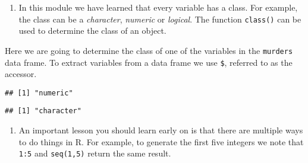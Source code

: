 \documentclass[
]{article}
\newenvironment{Shaded}{\begin{snugshade}}{\end{snugshade}}
\newcommand{\CommentTok}[1]{\textcolor[rgb]{0.56,0.35,0.01}{\textit{#1}}}
\newcommand{\KeywordTok}[1]{\textcolor[rgb]{0.13,0.29,0.53}{\textbf{#1}}}
\newcommand{\NormalTok}[1]{#1}
\newcommand{\OperatorTok}[1]{\textcolor[rgb]{0.81,0.36,0.00}{\textbf{#1}}}
\newcommand{\StringTok}[1]{\textcolor[rgb]{0.31,0.60,0.02}{#1}}
\providecommand{\tightlist}{%
  \setlength{\itemsep}{0pt}\setlength{\parskip}{0pt}}
\begin{document}
\begin{enumerate}
\def\labelenumi{\arabic{enumi}.}
\setcounter{enumi}{2}
\tightlist
\item
  In this module we have learned that every variable has a class. For
  example, the class can be a \emph{character}, \emph{numeric} or
  \emph{logical}. The function \texttt{class()} can be used to determine
  the class of an object.
\end{enumerate}

Here we are going to determine the class of one of the variables in the
\texttt{murders} data frame. To extract variables from a data frame we
use \texttt{\$}, referred to as the accessor.

\begin{Shaded}
\end{Shaded}

\begin{verbatim}
## [1] "numeric"
\end{verbatim}

\begin{Shaded}
\end{Shaded}

\begin{verbatim}
## [1] "character"
\end{verbatim}

\begin{enumerate}
\def\labelenumi{\arabic{enumi}.}
\setcounter{enumi}{3}
\tightlist
\item
  An important lesson you should learn early on is that there are
  multiple ways to do things in R. For example, to generate the first
  five integers we note that \texttt{1:5} and \texttt{seq(1,5)} return
  the same result.
\end{enumerate}
\end{document}
